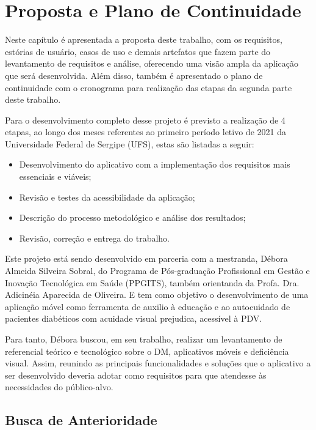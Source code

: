 \chapter{Proposta e Plano de Continuidade}

Neste capítulo é apresentada a proposta deste trabalho, com os requisitos, estórias de usuário, casos de uso e demais artefatos
que fazem parte do levantamento de requisitos e análise, oferecendo uma visão ampla da aplicação que será desenvolvida.
Além disso, também é apresentado o plano de continuidade com o cronograma para realização das etapas da segunda parte deste
trabalho.

Para o desenvolvimento completo desse projeto é previsto a realização de 4 etapas, ao longo dos meses referentes ao primeiro
período letivo de 2021 da Universidade Federal de Sergipe (UFS), estas são listadas a seguir:
\begin{itemize}
    \item Desenvolvimento do aplicativo com a implementação dos requisitos mais essenciais e viáveis;
    \item Revisão e testes da acessibilidade da aplicação;
    \item Descrição do processo metodológico e análise dos resultados;
    \item Revisão, correção e entrega do trabalho.
\end{itemize}

Este projeto está sendo desenvolvido em parceria com a mestranda, Débora Almeida Silveira Sobral, do
Programa de Pós-graduação Profissional em Gestão e Inovação Tecnológica em Saúde (PPGITS), também orientanda da Profa.
Dra. Adicinéia Aparecida de Oliveira. E tem como objetivo
o desenvolvimento de uma aplicação móvel como ferramenta de auxilio à educação e ao autocuidado de pacientes diabéticos
com acuidade visual prejudica, acessível à PDV\@.

Para tanto, Débora buscou, em seu trabalho, realizar um levantamento de referencial teórico e tecnológico sobre o DM,
aplicativos móveis e deficiência visual. Assim, reunindo as principais funcionalidades e soluções que o aplicativo a ser
desenvolvido deveria adotar como requisitos para que atendesse às necessidades do público-alvo.

\newpage

\section{Busca de Anterioridade}

